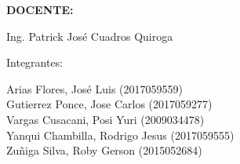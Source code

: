 \documentclass[12pt,letterpaper]{article}
\begin{document}
\begin{titlepage}
\begin{center}
\begin{large}
            \end{large}
            \vspace*{0.3in}
            \begin{Large}
                \textbf{DOCENTE:} \\
            \end{Large}
            \vspace*{0.1in}
            \begin{large}
                Ing. Patrick José Cuadros Quiroga\\
            \end{large}
            \vspace*{0.2in}
            \vspace*{0.1in}
            \begin{large}
                Integrantes: \\
                \begin{flushleft}
                    Arias Flores, José Luis 			\hfill	(2017059559) \\
                    Gutierrez Ponce, Jose Carlos  		\hfill	(2017059277) \\
                    Vargas Cusacani, Posi Yuri  		\hfill	(2009034478) \\
                    Yanqui Chambilla, Rodrigo Jesus  	\hfill	(2017059555) \\
                    Zuñiga Silva, Roby Gerson       	\hfill	(2015052684) \\
                \end{flushleft}
            \end{large}
        \end{center}
    \end{titlepage}
\end{document}
